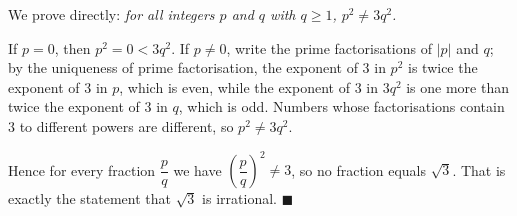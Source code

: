We prove directly: \emph{for all integers $p$ and $q$ with $q\ge1$, $p^2\ne3q^2$.}

If $p=0$, then $p^2=0<3q^2$. If $p\ne0$, write the prime factorisations of $|p|$ and $q$; by the uniqueness of prime factorisation, the exponent of $3$ in $p^2$ is twice the exponent of $3$ in $p$, which is even, while the exponent of $3$ in $3q^2$ is one more than twice the exponent of $3$ in $q$, which is odd. Numbers whose factorisations contain $3$ to different powers are different, so $p^2\ne3q^2$.

Hence for every fraction $\dfrac pq$ we have $\left(\dfrac pq\right)^2\ne3$, so no fraction equals $\sqrt3$. That is exactly the statement that $\sqrt3$ is irrational. $\blacksquare$
